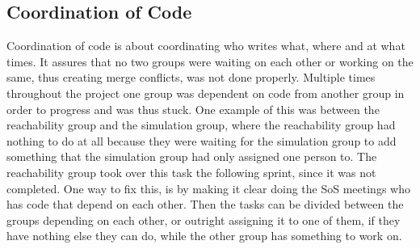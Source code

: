 \subsection{Coordination of Code}\label{sec:coordinationofcode}
Coordination of code is about coordinating who writes what, where and at what times.
It assures that no two groups were waiting on each other or working on the same, thus creating merge conflicts, was not done properly. Multiple times throughout the project one group was dependent on code from another group in order to progress and was thus stuck. 
One example of this was between the reachability group and the simulation group, where the reachability group had nothing to do at all because they were waiting for the simulation group to add something that the simulation group had only assigned one person to.
The reachability group took over this task the following sprint, since it was not completed.
One way to fix this, is by making it clear doing the SoS meetings who has code that depend on each other.
Then the tasks can be divided between the groups depending on each other, or outright assigning it to one of them, if they have nothing else they can do, while the other group has something to work on.

